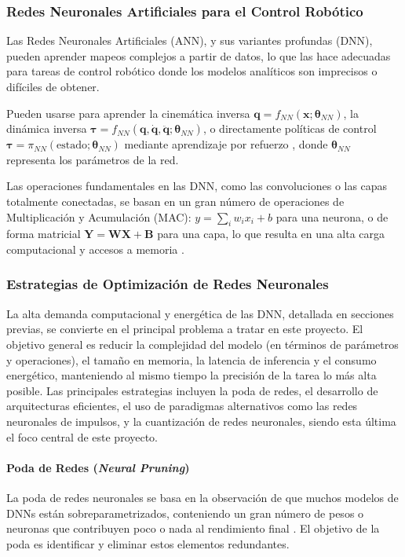 \documentclass[12pt]{article}
\begin{document}
\subsubsection{Redes Neuronales Artificiales para el Control Robótico}
\label{ssec:ann_control_robotico}
Las Redes Neuronales Artificiales (ANN), y sus variantes profundas (DNN), pueden aprender mapeos complejos a partir de datos, lo que las hace adecuadas para tareas de control robótico donde los modelos analíticos son imprecisos o difíciles de obtener.

Pueden usarse para aprender la cinemática inversa $\bm{q} = f_{NN}(\bm{x}; \bm{\theta}_{NN})$, la dinámica inversa $\bm{\tau} = f_{NN}(\bm{q}, \dot{\bm{q}}, \ddot{\bm{q}}; \bm{\theta}_{NN})$, o directamente políticas de control $\bm{\tau} = \pi_{NN}(\text{estado}; \bm{\theta}_{NN})$ mediante aprendizaje por refuerzo \cite{Park2025electronics, Zanatta2024exploring}, donde $\bm{\theta}_{NN}$ representa los parámetros de la red.

Las operaciones fundamentales en las DNN, como las convoluciones o las capas totalmente conectadas, se basan en un gran número de operaciones de Multiplicación y Acumulación (MAC): $y = \sum_i w_i x_i + b$ para una neurona, o de forma matricial $\bm{Y} = \bm{W}\bm{X} + \bm{B}$ para una capa, lo que resulta en una alta carga computacional y accesos a memoria \cite{Chen2021memristor}.

\subsubsection{Estrategias de Optimización de Redes Neuronales}
\label{ssec:optimizacion_nn_exp}
La alta demanda computacional y energética de las DNN, detallada en secciones previas, se convierte en el principal problema a tratar en este proyecto. El objetivo general es reducir la complejidad del modelo (en términos de parámetros y operaciones), el tamaño en memoria, la latencia de inferencia y el consumo energético, manteniendo al mismo tiempo la precisión de la tarea lo más alta posible. Las principales estrategias incluyen la poda de redes, el desarrollo de arquitecturas eficientes, el uso de paradigmas alternativos como las redes neuronales de impulsos, y la cuantización de redes neuronales, siendo esta última el foco central de este proyecto.

\paragraph{Poda de Redes (\textit{Neural Pruning})}
\label{sssec:pruning_exp}
La poda de redes neuronales se basa en la observación de que muchos modelos de DNNs están sobreparametrizados, conteniendo un gran número de pesos o neuronas que contribuyen poco o nada al rendimiento final \cite{Liang2021PruningSurvey}. El objetivo de la poda es identificar y eliminar estos elementos redundantes.
\end{document}
